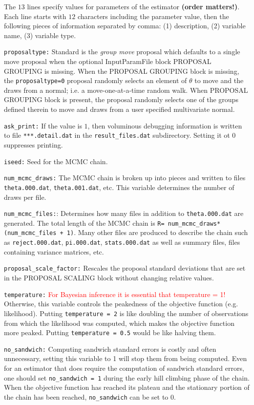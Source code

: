 \documentclass[11pt, letterpaper, notitlepage]{article}
\begin{document}
The $13$ lines specify values for parameters of the estimator \textbf{(order matters!)}. Each line starts with $12$ characters including the parameter value, then the following pieces of information separated by comma: (1) description, (2) variable name, (3) variable type. 


\texttt{proposaltype:} Standard is the \emph{group move} proposal which defaults to a single move proposal when the optional InputParamFile block PROPOSAL GROUPING is missing. When the PROPOSAL GROUPING block is missing, the \texttt{proposaltype=0} proposal randomly selects an element of $\theta$ to move and the draws from a normal; i.e. a move-one-at-a-time random walk. When PROPOSAL GROUPING block is present, the proposal randomly selects one of the groups defined therein to move and draws from a user specified multivariate normal. 

\texttt{ask\_print:} If the value is $1$, then voluminous debugging information is written to file \texttt{***.detail.dat} in the \texttt{result\_files.dat} subdirectory. Setting it ot $0$ suppresses printing.

\texttt{iseed:} Seed for the MCMC chain.

\texttt{num\_mcmc\_draws:} The MCMC chain is broken up into pieces and written to files \texttt{theta.000.dat}, \texttt{theta.001.dat}, etc. This variable determines the number of draws per file.

\texttt{num\_mcmc\_files:}: Determines how many files in addition to \texttt{theta.000.dat} are generated. The total length of the MCMC chain is \texttt{R= num\_mcmc\_draws*(num\_mcmc\_files + 1)}. Many other files are produced to describe the chain such as \texttt{reject.000.dat}, \texttt{pi.000.dat}, \texttt{stats.000.dat} as well as summary files, files containing variance matrices, etc. 

\texttt{proposal\_scale\_factor:} Rescales the proposal standard deviations that are set in the PROPOSAL SCALING
block without changing relative values.

\texttt{temperature:} \textcolor{red}{For Bayesian inference it is essential that temperature = 1!} Otherwise, this variable controls the peakedness of the objective function (e.g. likelihood). Putting \texttt{temperature = 2} is like doubling the number of observations from which the likelihood was computed, which makes the objective function more peaked. Putting \texttt{temperature = 0.5} would be like halving them. 

\texttt{no\_sandwich:} Computing sandwich standard errors is costly and often unnecessary, setting this variable to 1 will stop them from being computed. Even for an estimator that does require the computation of sandwich standard errors, one should set \texttt{no\_sandwich = 1} during the early hill climbing phase of the chain. When the objective function has reached its plateau and the stationary portion of the chain has been reached, \texttt{no\_sandwich} can be set to 0. 
\end{document}
